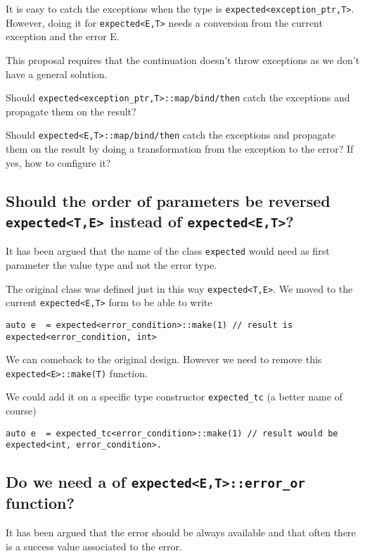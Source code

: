 \documentclass[a4paper,10pt]{article}
\newcommand{\cpp}[1]{\lstinline{#1}}
\begin{document}
It is easy to catch the exceptions when the type is \cpp{expected<exception_ptr,T>}. However, doing it for \cpp{expected<E,T>} needs a conversion from the current exception and the error E.

This proposal requires that the continuation doesn't throw exceptions as we don't have a general solution.

Should  \cpp{expected<exception_ptr,T>::map/bind/then} catch the exceptions and propagate them on the result?

Should  \cpp{expected<E,T>::map/bind/then} catch the exceptions and propagate them on the result by doing a transformation from the exception to the error? If yes, how to configure it?

\subsection{Should the order of parameters be reversed \cpp{expected<T,E>} instead of \cpp{expected<E,T>}?}

It has been argued that the name of the class \cpp{expected} would need as first parameter the value type and not the error type.

The original class was defined just in this way \cpp{expected<T,E>}. We moved to the current \cpp{expected<E,T>} form to be able to write

\begin{lstlisting}
auto e  = expected<error_condition>::make(1) // result is expected<error_condition, int>
\end{lstlisting}

We can comeback to the original design. However we need to remove this \cpp{expected<E>::make(T)} function. 

We could add it on a specific type constructor \cpp{expected_tc} (a better name of course)

\begin{lstlisting}
auto e  = expected_tc<error_condition>::make(1) // result would be expected<int, error_condition>.
\end{lstlisting}


\subsection{Do we need a of \cpp{expected<E,T>::error_or} function?}

It has been argued that the error should be always available and that often there is a success value associated to the error.
\end{document}
